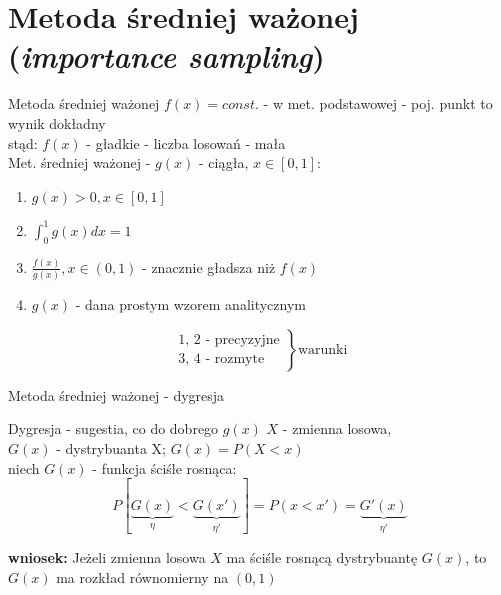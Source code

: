 \section{Metoda średniej ważonej ({\it importance sampling})}
\begin{frame}{Metoda średniej ważonej}
	$f(x) = const.$ - w met. podstawowej - poj. punkt to wynik dokładny \\
    stąd: $f(x)$ - gładkie - liczba losowań - mała
    \\[8pt]
    Met. średniej ważonej - $g(x)$ - ciągła, $x \in [0, 1]$:
    \begin{enumerate}[1)]
    	\item $g(x) > 0, x \in [0, 1]$
        \item $\int_0^1 g(x) dx = 1$
        \item $\frac{f(x)}{g(x)}, x \in (0, 1)$ - znacznie gładsza niż $f(x)$
        \item $g(x)$ - dana prostym wzorem analitycznym
    \end{enumerate}
    
    \[
    	\left.
        	\begin{array}{ll}
        		\text{1, 2 - precyzyjne} \\
        		\text{3, 4 - rozmyte}
        	\end{array}
        \right\} 
        \text{warunki}
    \]
\end{frame}
\begin{frame}{Metoda średniej ważonej - dygresja}
	\begin{block}{Dygresja - sugestia, co do dobrego $g(x)$}
		$X$ - zmienna losowa, \\
        $G(x)$ - dystrybuanta X; $G(x) = P(X < x)$
        \\[8pt]
        niech $G(x)$ - funkcja ściśle rosnąca: \[
        	P[\underbrace{G(x)}_\eta < \underbrace{G(x')}_{\eta'}] = P(x < x') = \underbrace{G'(x)}_{\eta'}
        \]
        
        {\bf wniosek:} Jeżeli zmienna losowa $X$ ma ściśle rosnącą dystrybuantę $G(x)$, to $G(x)$ ma rozkład równomierny na $(0, 1)$
	\end{block}
\end{frame}
